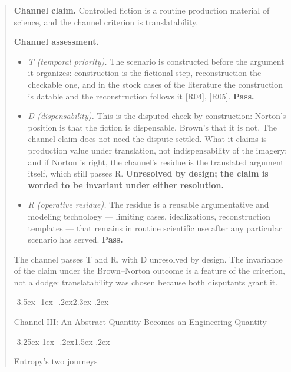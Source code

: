\documentclass[11pt,a4paper]{article}
\makeatletter
\renewcommand\section{\@startsection{section}{1}{\z@}%
  {-3.5ex \@plus -1ex \@minus -.2ex}{2.3ex \@plus .2ex}%
  {\normalfont\Large\bfseries\raggedright}}
\renewcommand\subsection{\@startsection{subsection}{2}{\z@}%
  {-3.25ex\@plus -1ex \@minus -.2ex}{1.5ex \@plus .2ex}%
  {\normalfont\large\bfseries\raggedright}}
\makeatother
\begin{document}
\begin{abstract}
\textbf{Channel claim.} Controlled fiction is a routine production material of science, and the channel criterion is translatability.

\textbf{Channel assessment.}

\begin{itemize}[leftmargin=1.6em,itemsep=2pt,parsep=0pt,topsep=3pt]
\item \textit{T (temporal priority).} The scenario is constructed before the argument it organizes: construction is the fictional step, reconstruction the checkable one, and in the stock cases of the literature the construction is datable and the reconstruction follows it [R04], [R05]. \textbf{Pass.}
\item \textit{D (dispensability).} This is the disputed check by construction: Norton's position is that the fiction is dispensable, Brown's that it is not. The channel claim does not need the dispute settled. What it claims is production value under translation, not indispensability of the imagery; and if Norton is right, the channel's residue is the translated argument itself, which still passes R. \textbf{Unresolved by design; the claim is worded to be invariant under either resolution.}
\item \textit{R (operative residue).} The residue is a reusable argumentative and modeling technology — limiting cases, idealizations, reconstruction templates — that remains in routine scientific use after any particular scenario has served. \textbf{Pass.}
\end{itemize}

The channel passes T and R, with D unresolved by design. The invariance of the claim under the Brown–Norton outcome is a feature of the criterion, not a dodge: translatability was chosen because both disputants grant it.

\section{Channel III: An Abstract Quantity Becomes an Engineering Quantity}

\subsection{Entropy's two journeys}


\end{abstract}
\end{document}
